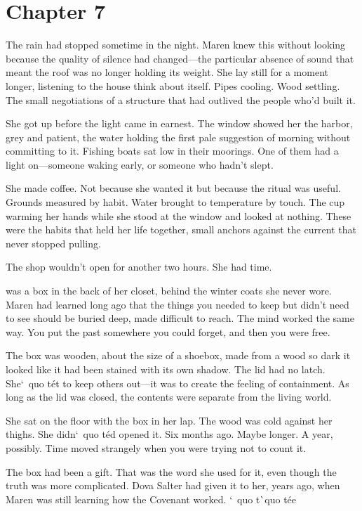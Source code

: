 \documentclass[12pt,letterpaper,openany]{book}
\begin{document}
\chapter{Chapter 7}
The rain had stopped sometime in the night. Maren knew this without looking because the quality of silence had changed—the particular absence of sound that meant the roof was no longer holding its weight. She lay still for a moment longer, listening to the house think about itself. Pipes cooling. Wood settling. The small negotiations of a structure that had outlived the people who'd built it.
\par
She got up before the light came in earnest. The window showed her the harbor, grey and patient, the water holding the first pale suggestion of morning without committing to it. Fishing boats sat low in their moorings. One of them had a light on—someone waking early, or someone who hadn't slept.
\par
She made coffee. Not because she wanted it but because the ritual was useful. Grounds measured by habit. Water brought to temperature by touch. The cup warming her hands while she stood at the window and looked at nothing. These were the habits that held her life together, small anchors against the current that never stopped pulling.
\par
The shop wouldn't open for another two hours. She had time.
\par
\hrulefillThere was a box in the back of her closet, behind the winter coats she never wore. Maren had learned long ago that the things you needed to keep but didn't need to see should be buried deep, made difficult to reach. The mind worked the same way. You put the past somewhere you could forget, and then you were free.
\par
The box was wooden, about the size of a shoebox, made from a wood so dark it looked like it had been stained with its own shadow. The lid had no latch. She`\ quo t\'e{}t to keep others out—it was to create the feeling of containment. As long as the lid was closed, the contents were separate from the living world.
\par
She sat on the floor with the box in her lap. The wood was cold against her thighs. She didn`\ quo t\'e{}d opened it. Six months ago. Maybe longer. A year, possibly. Time moved strangely when you were trying not to count it.
\par
The box had been a gift. That was the word she used for it, even though the truth was more complicated. Dova Salter had given it to her, years ago, when Maren was still learning how the Covenant worked. `\ quo t\`\ quo t\'e{}e{}
\end{document}
